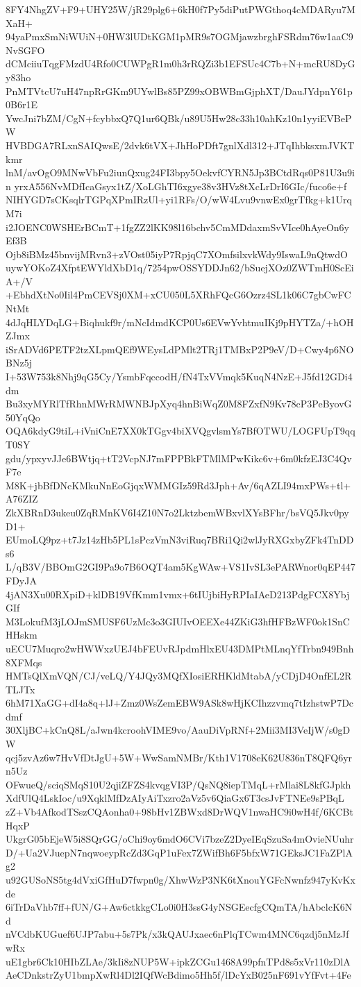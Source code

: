 8FY4NhgZV+F9+UHY25W/jR29plg6+6kH0f7Py5diPutPWGthoq4cMDARyu7MXaH+
94yaPmxSmNiWUiN+0HW3lUDtKGM1pMR9s7OGMjawzbrghFSRdm76w1aaC9NvSGFO
dCMciiuTqgFMzdU4Rfo0CUWPgR1m0h3rRQZi3b1EFSUc4C7b+N+mcRU8DyGy83ho
PnMTVtcU7uH47npRrGKm9UYwlBs85PZ99xOBWBmGjphXT/DauJYdpnY61p0B6r1E
YwcJni7bZM/CgN+fcybbxQ7Q1ur6QBk/u89U5Hw28c33h10ahKz10n1yyiEVBePW
HVBDGA7RLxnSAIQwsE/2dvk6tVX+JhHoPDft7gnlXdl312+JTqIhbksxmJVKTkmr
lnM/avOgO9MNwVbFu2iunQxug24FI3bpy5OekvfCYRN5Jp3BCtdRqs0P81U3u9in
yrxA556NvMDfIcaGsyx1tZ/XoLGhTI6xgye38v3HVz8tXcLrDrI6GIc/fuco6e+f
NIHYGD7sCKsqlrTGPqXPmIRzUl+yi1RFs/O/wW4Lvu9vnwEx0grTfkg+k1UrqM7i
i2JOENC0WSHErBCmT+1fgZZ2lKK98l16bchv5CmMDdaxmSvVIce0hAyeOn6yEf3B
Ojb8iBMz45bnvijMRvn3+zVOst05iyP7RpjqC7XOmfsilxvkWdy9IswaL9nQtwdO
uywYOKoZ4XfptEWYldXbD1q/7254pwOSSYDDJn62/bSuejXOz0ZWTmH0ScEiA+/V
+EbhdXtNo0Iil4PmCEVSj0XM+xCU050L5XRhFQcG6Ozrz4SL1k06C7gbCwFCNtMt
4dJqHLYDqLG+Biqhukf9r/mNcIdmdKCP0Us6EVwYvhtmuIKj9pHYTZa/+hOHZJmx
iSrADVd6PETF2tzXLpmQEf9WEysLdPMlt2TRj1TMBxP2P9eV/D+Cwy4p6NOBNz5j
I+53W753k8Nhj9qG5Cy/YsmbFqccodH/fN4TxVVmqk5KuqN4NzE+J5fd12GDi4dm
Bu3xyMYRlTfRhnMWrRMWNBJpXyq4hnBiWqZ0M8FZxfN9Kv78cP3PeByovG50YqQo
OQA6kdyG9tiL+iVniCnE7XX0kTGgv4biXVQgvlsmYs7BfOTWU/LOGFUpT9qqT0SY
gdu/ypxyvJJe6BWtjq+tT2VcpNJ7mFPPBkFTMlMPwKikc6v+6m0kfzEJ3C4QvF7e
M8K+jbBfDNcKMkuNnEoGjqxWMMGIz59Rd3Jph+Av/6qAZLI94mxPWs+tl+A76ZIZ
ZkXBRnD3ukeu0ZqRMnKV6I4Z10N7o2LktzbemWBxvlXYsBFhr/bsVQ5Jkv0pyD1+
EUmoLQ9pz+t7Jz14zHb5PL1sPczVmN3viRuq7BRi1Qi2wlJyRXGxbyZFk4TnDDs6
L/qB3V/BBOmG2GI9Pa9o7B6OQT4am5KgWAw+VS1IvSL3ePARWnor0qEP447FDyJA
4jAN3Xu00RXpiD+klDB19VfKmm1vmx+6tIUjbiHyRPIaIAeD213PdgFCX8YbjGIf
M3LokufM3jLOJmSMUSF6UzMc3o3GIUIvOEEXe44ZKiG3hfHFBzWF0ok1SnCHHskm
uECU7Muqro2wHWWxzUEJ4bFEUvRJpdmHlxEU43DMPtMLnqYfTrbn949Bnh8XFMqs
HMTsQlXmVQN/CJ/veLQ/Y4JQy3MQfXIosiERHKldMtabA/yCDjD4OnfEL2RTLJTx
6hM71XaGG+dI4a8q+lJ+Zmz0WsZemEBW9ASk8wHjKCIhzzvmq7tIzhstwP7Dcdmf
30XljBC+kCnQ8L/aJwn4kcroohVIME9vo/AauDiVpRNf+2Mii3MI3VeIjW/s0gDW
qcj5zvAz6w7HvVfDtJgU+5W+WwSamNMBr/Kth1V1708eK62U836nT8QFQ6yrn5Uz
OFwueQ/sciqSMqS10U2qjiZFZS4kvqgVI3P/QsNQ8iepTMqL+rMlai8L8kfGJpkh
XdfUlQ4LskIoc/u9XqklMfDzAIyAiTxzro2aVz5v6QiaGx6T3csJvFTNEe9sPBqL
zZ+Vb4AfkodTSszCQAonha0+98bHv1ZBWxd8DrWQV1nwaHC9i0wH4f/6KCBtHqxP
UkgrG05bEjeW5i8SQrGG/oChi9oy6mdO6CVi7bzeZ2DyeIEqSzuSa4mOvieNUuhr
D/+Ua2VJuepN7nqwoeypRcZd3GqP1uFex7ZWifBh6F5bfxW71GEksJC1FaZPlAg2
u92GUSoNS5tg4dVxiGfHuD7fwpn0g/XhwWzP3NK6tXnouYGFcNwnfz947yKvKxde
6iTrDaVhb7ff+fUN/G+Aw6ctkkgCLo0i0H3ssG4yNSGEecfgCQmTA/hAbclcK6Nd
nVCdbKUGuef6UJP7abu+5s7Pk/x3kQAUJxaec6nPlqTCwm4MNC6qzdj5nMzJfwRx
uE1gbr6Ck10HIbZLAe/3kIi8zNUP5W+ipkZCGu1468A99pfnTPd8s5xVr110zDlA
AeCDnkstrZyU1bmpXwRl4Dl2IQfWcBdimo5Hh5f/lDcYxB025nF691vYfFvt+4Fe
